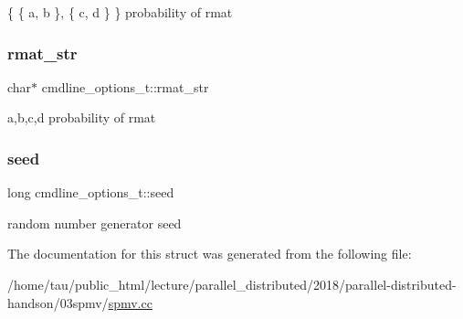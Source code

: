 \{ \{ a, b \}, \{ c, d \} \} probability of rmat \mbox{\label{structcmdline__options__t_a4ae2cfd5fda7a25e302fff37c1201f93}} 
\subsubsection{\texorpdfstring{rmat\+\_\+str}{rmat\_str}}
{\footnotesize\ttfamily char$\ast$ cmdline\+\_\+options\+\_\+t\+::rmat\+\_\+str}

a,b,c,d probability of rmat \mbox{\label{structcmdline__options__t_a065412d7cdc54cdae630389c3fda266e}} 
\subsubsection{\texorpdfstring{seed}{seed}}
{\footnotesize\ttfamily long cmdline\+\_\+options\+\_\+t\+::seed}

random number generator seed 

The documentation for this struct was generated from the following file\+:\begin{DoxyCompactItemize}
\item 
/home/tau/public\+\_\+html/lecture/parallel\+\_\+distributed/2018/parallel-\/distributed-\/handson/03spmv/\hyperlink{spmv_8cc}{spmv.\+cc}\end{DoxyCompactItemize}
